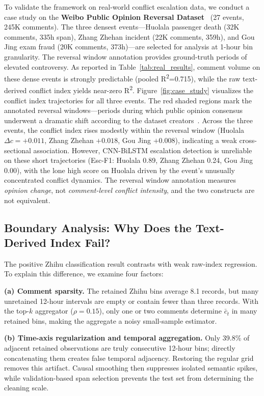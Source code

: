 \documentclass[journal]{IEEEtran}
\begin{document}
To validate the framework on real-world conflict escalation data, we conduct a case study on the \textbf{Weibo Public Opinion Reversal Dataset}~\cite{Zhang2023Reversal} (27 events, 245K comments). The three densest events---Huolala passenger death (32K comments, 335h span), Zhang Zhehan incident (22K comments, 359h), and Gou Jing exam fraud (20K comments, 373h)---are selected for analysis at 1-hour bin granularity. The reversal window annotation provides ground-truth periods of elevated controversy. As reported in Table~\ref{tab:real_results}, comment volume on these dense events is strongly predictable (pooled R\textsuperscript{2}=0.715), while the raw text-derived conflict index yields near-zero R\textsuperscript{2}. Figure~\ref{fig:case_study} visualizes the conflict index trajectories for all three events. The red shaded regions mark the annotated reversal windows---periods during which public opinion consensus underwent a dramatic shift according to the dataset creators~\cite{Zhang2023Reversal}. Across the three events, the conflict index rises modestly within the reversal window (Huolala $\Delta c=+0.011$, Zhang Zhehan $+0.018$, Gou Jing $+0.008$), indicating a weak cross-sectional association. However, CNN-BiLSTM escalation detection is unreliable on these short trajectories (Esc-F1: Huolala 0.89, Zhang Zhehan 0.24, Gou Jing 0.00), with the lone high score on Huolala driven by the event's unusually concentrated conflict dynamics. The reversal window annotation measures \emph{opinion change}, not \emph{comment-level conflict intensity}, and the two constructs are not equivalent.

\subsection{Boundary Analysis: Why Does the Text-Derived Index Fail?}\label{sec:discussion}\label{sec:attribution}

The positive Zhihu classification result contrasts with weak raw-index regression. To explain this difference, we examine four factors:

\textbf{(a) Comment sparsity.} The retained Zhihu bins average 8.1 records, but many unretained 12-hour intervals are empty or contain fewer than three records. With the top-$k$ aggregator ($\rho{=}0.15$), only one or two comments determine $\bar{c}_t$ in many retained bins, making the aggregate a noisy small-sample estimator.

\textbf{(b) Time-axis regularization and temporal aggregation.} Only 39.8\% of adjacent retained observations are truly consecutive 12-hour bins; directly concatenating them creates false temporal adjacency. Restoring the regular grid removes this artifact. Causal smoothing then suppresses isolated semantic spikes, while validation-based span selection prevents the test set from determining the cleaning scale.
\end{document}
